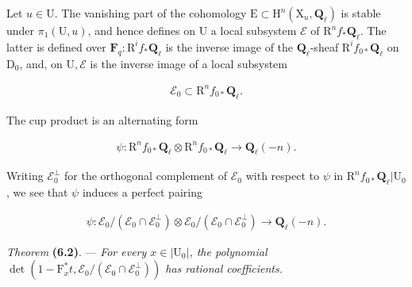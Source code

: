 \documentclass[10pt,leqno]{article}
\begin{document}
\noindent Let \(u\in \mathrm{U}\). The vanishing part of the cohomology \(\mathrm{E}\subset \mathrm{H}^{n}(\mathrm{X}_{u},\mathbf{Q}_{\ell })\) is stable under \(\pi _{1}(\mathrm{U},u)\), and hence defines on \(\mathrm{U}\) a local subsystem \(\mathcal{E} \) of \(\mathrm{R}^{n} f_{*}\mathbf{Q}_{\ell }\). The latter is defined over \(\mathbf{F}_{q} : \mathrm{R}^{i} f_{*}\mathbf{Q}_{\ell }\) is the inverse image of the \(\mathbf{Q}_{\ell }\)-sheaf \(\mathrm{R}^{i} f_{0*}\mathbf{Q}_{\ell }\) on \(\mathrm{D}_{0}\), and, on \(\mathrm{U}, \mathcal{E} \) is the inverse image of a local subsystem\par

\begin{equation*}\begin{gathered}\mathcal{E} _{0} \subset  \mathrm{R}^{n} f_{0*}\mathbf{Q}_{\ell }.\end{gathered}\end{equation*}

\noindent The cup product is an alternating form\par

\begin{equation*}\begin{gathered}\psi  : \mathrm{R}^{n} f_{0*}\mathbf{Q}_{\ell }\otimes \mathrm{R}^{n} f_{0*}\mathbf{Q}_{\ell } \longrightarrow  \mathbf{Q}_{\ell }(- n).\end{gathered}\end{equation*}

\noindent Writing \(\mathcal{E} _{0}^{\perp }\) for the orthogonal complement of \(\mathcal{E} _{0}\) with respect to \(\psi \) in \(\mathrm{R}^{n} f_{0*}\mathbf{Q}_{\ell }|\mathrm{U}_{0}\), we see that \(\psi \) induces a perfect pairing\par

\begin{equation*}\begin{gathered}\psi  : \mathcal{E} _{0}/(\mathcal{E} _{0}\cap \mathcal{E} _{0}^{\perp })\otimes \mathcal{E} _{0}/(\mathcal{E} _{0}\cap \mathcal{E} _{0}^{\perp }) \longrightarrow  \mathbf{Q}_{\ell }(- n).\end{gathered}\end{equation*}

\noindent \emph{Theorem} \textbf{(6.2)}. — {\itshape For every \(x\in |\mathrm{U}_{0}|\), the polynomial \(\operatorname{det}(1- \mathrm{F}_{x}^{*}t,\mathcal{E} _{0}/(\mathcal{E} _{0}\cap \mathcal{E} _{0}^{\perp }))\) has rational coefficients.}\par
\end{document}
